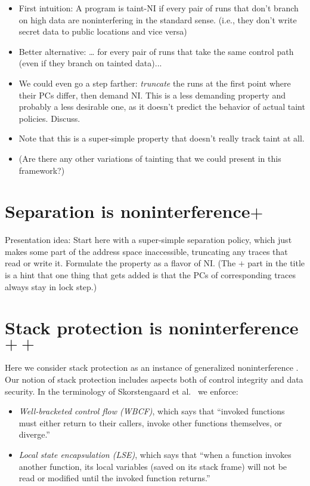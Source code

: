 \documentclass[conference]{IEEEtran}
\begin{document}
\begin{itemize}
\item First intuition: A program is taint-NI if every pair of runs that don’t
branch on high data are noninterfering in the standard sense.  (i.e., they
don't write secret data to public locations and vice versa)
\item Better alternative: … for every pair of runs that take the same control path (even if they branch on tainted data)...
\item We could even go a step farther: {\em truncate} the runs at the
  first point where their PCs differ, then demand NI.  This is a less
  demanding property and probably a less desirable one, as it doesn't
  predict the behavior of actual taint policies.  Discuss.
\item Note that this is a super-simple property that doesn't really track
taint at all.
\item (Are there any other variations of tainting that we could present in
this framework?)
\end{itemize}


\section{Separation is noninterference$+$}

Presentation idea: Start here with a super-simple separation policy, which
just makes some part of the address space inaccessible, truncating any
traces that read or write it.  Formulate the property as a flavor of NI.
(The $+$ part in the title is a hint that one thing that gets added is that
the PCs of corresponding traces always stay in lock step.)

\section{Stack protection is noninterference$++$}

Here we consider stack protection as an instance of generalized noninterference .
Our notion of stack protection includes aspects both of control integrity and data security.
In the terminology of Skorstengaard et al.~\cite{Skorstengaard+19} we enforce:

\begin{itemize}
\item \emph{Well-bracketed control flow (WBCF)}, which says that ``invoked functions must either return to their callers,
  invoke other functions themselves, or diverge.''
\item \emph{Local state encapsulation (LSE)}, which says that ``when a function invokes another function, its local variables
  (saved on its stack frame) will not be read or modified until the invoked function returns.''
\end{itemize}
\end{document}
